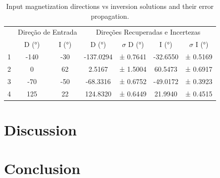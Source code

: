 \documentclass[manuscript,revised]{geophysics}
\begin{document}
\begin{table}[htbp]
\caption{Input magnetization directions vs inversion solutions and their error propagation.}
\label{tab:inversionresults}
\centering
\begin{tabular}[width=1.0\textwidth]{ccccccc}
\rowcolor[HTML]{E7E7E7} 
\cellcolor[HTML]{E7E7E7}                         & \multicolumn{2}{c}{\cellcolor[HTML]{E7E7E7}Direção de Entrada} & \multicolumn{4}{c}{\cellcolor[HTML]{E7E7E7}Direções Recuperadas e   Incertezas} \\
\rowcolor[HTML]{E7E7E7} 
\multirow{-2}{*}{\cellcolor[HTML]{E7E7E7}Esfera} & D (°)                          & I (°)                         & D (°)               & $\sigma$ D (°)            & I (°)             & $\sigma$ I (°)           \\
1                                                & -140                           & -30                           & -137.0294           & ± 0.7641          & -32.6550          & ± 0.5169          \\
\rowcolor[HTML]{E7E7E7} 
2                                                & 0                              & 62                            & 2.5167              & ± 1.5004          & 60.5473           & ± 0.6917          \\
3                                                & -70                            & -50                           & -68.3316            & ± 0.6752          & -49.0172          & ± 0.3923          \\
\rowcolor[HTML]{E7E7E7} 
4                                                & 125                            & 22                            & 124.8320            & ± 0.6449          & 21.9940           & ± 0.4515         
\end{tabular}
\end{table}





\section{Discussion}

\section{Conclusion}
\end{document}
